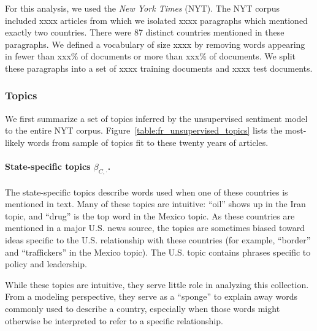 For this analysis, we used the \emph{New York Times}
(NYT).  The NYT corpus included xxxx articles
from which we isolated xxxx paragraphs which mentioned exactly two
countries. There were 87 distinct countries mentioned in these
paragraphs.  We defined a vocabulary of size xxxx by removing words
appearing in fewer than xxx\% of documents or more than xxx\% of
documents.  We split these paragraphs into a set of xxxx training
documents and xxxx test documents.


\subsubsection*{Topics}
We first summarize a set of topics inferred by the unsupervised
sentiment model to the entire NYT corpus.
Figure~\ref{table:fr_unsupervised_topics} lists the most-likely words
from sample of topics fit to these twenty years of articles.

\paragraph{State-specific topics $\beta_{C,\cdot}$.}  The
state-specific topics describe words used when one of these countries
is mentioned in text.  Many of these topics are intuitive: ``oil''
shows up in the Iran topic, and ``drug'' is the top word in the Mexico
topic.  As these countries are mentioned in a major U.S. news source,
the topics are sometimes biased toward ideas specific to the
U.S. relationship with these countries (for example, ``border'' and
``traffickers'' in the Mexico topic).  The U.S. topic contains phrases
specific to policy and leadership.

While these topics are intuitive, they serve little role in analyzing
this collection.  From a modeling perspective, they serve as a
``sponge'' to explain away words commonly used to describe a country,
especially when those words might otherwise be interpreted to refer to
a specific relationship.

